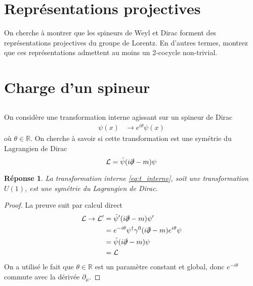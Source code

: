 \documentclass{article}
\numberwithin{equation}{section}
\theoremstyle{solution}
\newtheorem{solution}{Réponse}[section]
\begin{document}
\section{Représentations projectives}
On cherche à montrer que les spineurs de Weyl et Dirac forment des représentations projectives du groupe
de Lorentz. 
En d’autres termes, montrez que ces représentations admettent au moins un 2-cocycle non-trivial.

\section{Charge d’un spineur}
\subsection{}
On considère une transformation interne agissant sur un spineur de Dirac
\begin{equation}\label{eq:t_interne}
	\begin{split}
		\psi(x) &\rightarrow e^{i\theta}\psi(x)
	\end{split}
\end{equation} 
où $\theta \in \mathbb{R}$. On cherche à savoir si cette transformation est une symétrie du Lagrangien de Dirac
\begin{equation}\label{eq:dirac_L}
	\mathcal{L} = \bar{\psi}(i \slashed{\partial} - m)\psi
\end{equation} 

\begin{solution}
La transformation interne \eqref{eq:t_interne}, soit une transformation $U(1)$, est une symétrie du Lagrangien de Dirac.	
\end{solution}
\begin{proof}
La preuve suit par calcul direct
\begin{align*}
        \mathcal{L} \rightarrow \mathcal{L}'  &= \bar{\psi}'  (i \slashed{\partial} - m) \psi' \\
                &= e^{-i\theta} \psi^{\dagger} \gamma^0(i \slashed{\partial} - m) e^{i\theta} \psi \\
                &= \bar{\psi} (i \slashed{\partial} - m)  \psi \\
                &= \mathcal{L}
\end{align*}	
On a utilisé le fait que $\theta \in \mathbb{R}$ est un paramètre constant et global, donc $e^{-i\theta}$ commute avec 
la dérivée $\partial_\mu$.
\end{proof}
\end{document}
